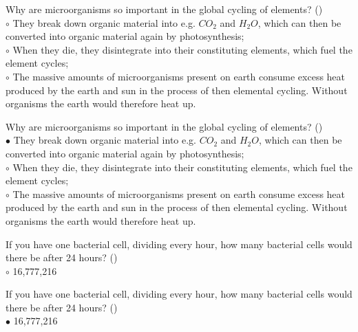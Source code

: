 \documentclass[]{beamer}
\begin{document}
\begin{frame}[shrink] {}
\addtocounter{questions}{1}
\color{blue}
Why are microorganisms so important in the global cycling of elements? ()\\
\color{black}
\setlength{\parindent}{-0.4cm}
{\color{red}$\circ$} They break down organic material into e.g. $CO_2$ and $H_2O$, which can
then be converted into organic material again by photosynthesis;\\
{\color{red}$\circ$} When they die, they disintegrate into their constituting elements,
which fuel the element cycles;\\
{\color{red}$\circ$} The massive amounts of microorganisms present on earth
consume excess heat produced by the earth and sun in the process of
then elemental cycling. Without organisms the earth would therefore heat up.
\end{frame}
\begin{frame}[shrink] {}
\addtocounter{answers}{1}
\color{blue}
Why are microorganisms so important in the global cycling of elements? ()\\
\color{black}
\setlength{\parindent}{-0.4cm}
{\color{red}$\bullet$} They break down organic material into e.g. $CO_2$ and $H_2O$, which can
then be converted into organic material again by photosynthesis;\\
{\color{red}$\circ$} When they die, they disintegrate into their constituting elements,
which fuel the element cycles;\\
{\color{red}$\circ$} The massive amounts of microorganisms present on earth
consume excess heat produced by the earth and sun in the process of
then elemental cycling. Without organisms the earth would therefore heat up.
\end{frame}

\begin{frame}[shrink] {}
\addtocounter{questions}{1}
\color{blue}
If you have one bacterial cell, dividing every hour, how many bacterial
cells would there be after 24 hours? ()\\
\color{black}
\setlength{\parindent}{-0.4cm}
{\color{red}$\circ$} 16,777,216
\end{frame}
\begin{frame}[shrink] {}
\addtocounter{answers}{1}
\color{blue}
If you have one bacterial cell, dividing every hour, how many bacterial
cells would there be after 24 hours? ()\\
\color{black}
\setlength{\parindent}{-0.4cm}
{\color{red}$\bullet$} 16,777,216
\end{frame}
\end{document}
